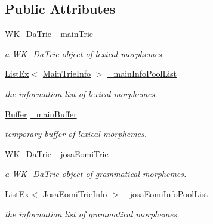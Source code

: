 \subsection*{Public Attributes}
\begin{CompactItemize}
\item 
\hyperlink{classkmaOrange_1_1WK__DaTrie}{WK\_\-DaTrie} \hyperlink{classkmaOrange_1_1Dictionary_52eb564f4339216c94d197ca3cadb7e7}{\_\-mainTrie}
\begin{CompactList}\small\item\em a \hyperlink{classkmaOrange_1_1WK__DaTrie}{WK\_\-DaTrie} object of lexical morphemes. \item\end{CompactList}\item 
\hyperlink{classListEx}{ListEx}$<$ \hyperlink{classMainTrieInfo}{MainTrieInfo} $>$ \hyperlink{classkmaOrange_1_1Dictionary_8b4809c5e4427e0a886ebb98ccb1458e}{\_\-mainInfoPoolList}
\begin{CompactList}\small\item\em the information list of lexical morphemes. \item\end{CompactList}\item 
\hyperlink{classkmaOrange_1_1Buffer}{Buffer} \hyperlink{classkmaOrange_1_1Dictionary_6d1c4742b3526ce18ef708b16afb9686}{\_\-mainBuffer}
\begin{CompactList}\small\item\em temporary buffer of lexical morphemes. \item\end{CompactList}\item 
\hyperlink{classkmaOrange_1_1WK__DaTrie}{WK\_\-DaTrie} \hyperlink{classkmaOrange_1_1Dictionary_580a2bff4df42be6211a7695c77c3a41}{\_\-josaEomiTrie}
\begin{CompactList}\small\item\em a \hyperlink{classkmaOrange_1_1WK__DaTrie}{WK\_\-DaTrie} object of grammatical morphemes. \item\end{CompactList}\item 
\hyperlink{classListEx}{ListEx}$<$ \hyperlink{classJosaEomiTrieInfo}{JosaEomiTrieInfo} $>$ \hyperlink{classkmaOrange_1_1Dictionary_b9784b60c4c70b298bca88ab0857075b}{\_\-josaEomiInfoPoolList}
\begin{CompactList}\small\item\em the information list of grammatical morphemes. \item\end{CompactList}\item 

\end{CompactItemize}
